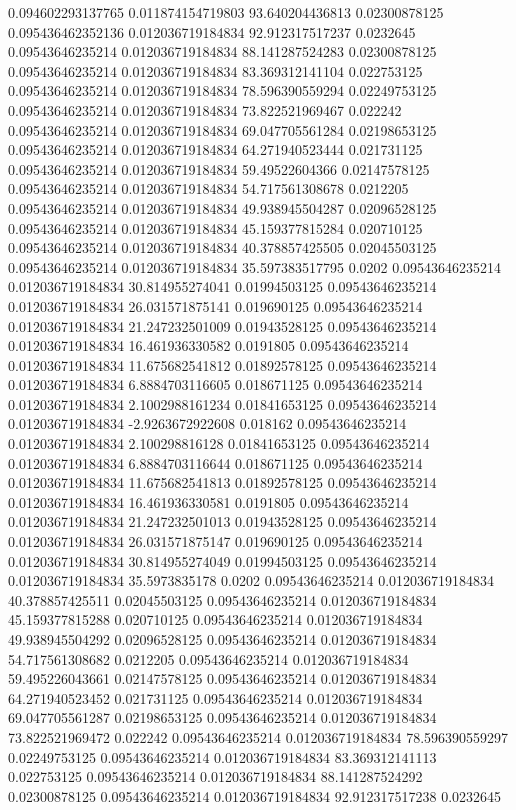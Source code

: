 0.094602293137765 0.011874154719803 93.640204436813 0.02300878125
0.095436462352136 0.012036719184834 92.912317517237 0.0232645
0.09543646235214 0.012036719184834 88.141287524283 0.02300878125
0.09543646235214 0.012036719184834 83.369312141104 0.022753125
0.09543646235214 0.012036719184834 78.596390559294 0.02249753125
0.09543646235214 0.012036719184834 73.822521969467 0.022242
0.09543646235214 0.012036719184834 69.047705561284 0.02198653125
0.09543646235214 0.012036719184834 64.271940523444 0.021731125
0.09543646235214 0.012036719184834 59.49522604366 0.02147578125
0.09543646235214 0.012036719184834 54.717561308678 0.0212205
0.09543646235214 0.012036719184834 49.938945504287 0.02096528125
0.09543646235214 0.012036719184834 45.159377815284 0.020710125
0.09543646235214 0.012036719184834 40.378857425505 0.02045503125
0.09543646235214 0.012036719184834 35.597383517795 0.0202
0.09543646235214 0.012036719184834 30.814955274041 0.01994503125
0.09543646235214 0.012036719184834 26.031571875141 0.019690125
0.09543646235214 0.012036719184834 21.247232501009 0.01943528125
0.09543646235214 0.012036719184834 16.461936330582 0.0191805
0.09543646235214 0.012036719184834 11.675682541812 0.01892578125
0.09543646235214 0.012036719184834 6.8884703116605 0.018671125
0.09543646235214 0.012036719184834 2.1002988161234 0.01841653125
0.09543646235214 0.012036719184834 -2.9263672922608 0.018162
0.09543646235214 0.012036719184834 2.100298816128 0.01841653125
0.09543646235214 0.012036719184834 6.8884703116644 0.018671125
0.09543646235214 0.012036719184834 11.675682541813 0.01892578125
0.09543646235214 0.012036719184834 16.461936330581 0.0191805
0.09543646235214 0.012036719184834 21.247232501013 0.01943528125
0.09543646235214 0.012036719184834 26.031571875147 0.019690125
0.09543646235214 0.012036719184834 30.814955274049 0.01994503125
0.09543646235214 0.012036719184834 35.5973835178 0.0202
0.09543646235214 0.012036719184834 40.378857425511 0.02045503125
0.09543646235214 0.012036719184834 45.159377815288 0.020710125
0.09543646235214 0.012036719184834 49.938945504292 0.02096528125
0.09543646235214 0.012036719184834 54.717561308682 0.0212205
0.09543646235214 0.012036719184834 59.495226043661 0.02147578125
0.09543646235214 0.012036719184834 64.271940523452 0.021731125
0.09543646235214 0.012036719184834 69.047705561287 0.02198653125
0.09543646235214 0.012036719184834 73.822521969472 0.022242
0.09543646235214 0.012036719184834 78.596390559297 0.02249753125
0.09543646235214 0.012036719184834 83.369312141113 0.022753125
0.09543646235214 0.012036719184834 88.141287524292 0.02300878125
0.09543646235214 0.012036719184834 92.912317517238 0.0232645
